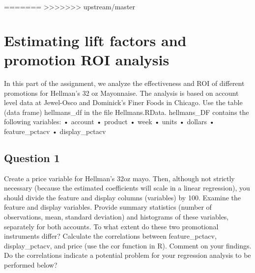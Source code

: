 \documentclass[]{article}
\begin{document}
=======
\textgreater{}\textgreater{}\textgreater{}\textgreater{}\textgreater{}\textgreater{}\textgreater{}
upstream/master \newpage

\hypertarget{estimating-lift-factors-and-promotion-roi-analysis}{%
\section{Estimating lift factors and promotion ROI
analysis}\label{estimating-lift-factors-and-promotion-roi-analysis}}

In this part of the assignment, we analyze the effectiveness and ROI of
different promotions for Hellman's 32 oz Mayonnaise. The analysis is
based on account level data at Jewel-Osco and Dominick's Finer Foods in
Chicago. Use the table (data frame) hellmans\_df in the file
Hellmans.RData. hellmans\_DF contains the following variables: \newline
• account \newline • product \newline • week \newline • units \newline •
dollars \newline • feature\_pctacv \newline • display\_pctacv \newline

\medskip

\hypertarget{question-1}{%
\subsection{Question 1}\label{question-1}}

Create a price variable for Hellman's 32oz mayo. Then, although not
strictly necessary (because the estimated coefficients will scale in a
linear regression), you should divide the feature and display columns
(variables) by 100. Examine the feature and display variables. Provide
summary statistics (number of observations, mean, standard deviation)
and histograms of these variables, separately for both accounts. To what
extent do these two promotional instruments differ? Calculate the
correlations between feature\_pctacv, display\_pctacv, and price (use
the cor function in R). Comment on your findings. Do the correlations
indicate a potential problem for your regression analysis to be
performed below?
\end{document}
